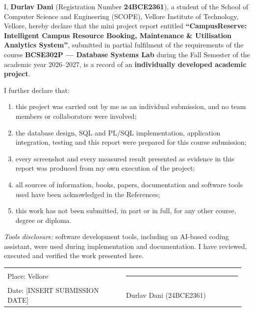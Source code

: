 \documentclass[12pt,a4paper,oneside]{report}
\newcommand{\submissiondate}{[INSERT SUBMISSION DATE]}
\renewcommand{\_}{\origus\allowbreak}
\begin{document}
I, \textbf{Durlav Dani} (Registration Number \textbf{24BCE2361}), a student of the School of Computer Science and Engineering (SCOPE), Vellore Institute of Technology, Vellore, hereby declare that the mini project report entitled \textbf{``CampusReserve: Intelligent Campus Resource Booking, Maintenance \& Utilisation Analytics System''}, submitted in partial fulfilment of the requirements of the course \textbf{BCSE302P --- Database Systems Lab} during the Fall Semester of the academic year 2026--2027, is a record of an \textbf{individually developed academic project}.

I further declare that:
\begin{enumerate}
  \item this project was carried out by me as an individual submission, and no team members or collaborators were involved;
  \item the database design, SQL and PL/SQL implementation, application integration, testing and this report were prepared for this course submission;
  \item every screenshot and every measured result presented as evidence in this report was produced from my own execution of the project;
  \item all sources of information, books, papers, documentation and software tools used have been acknowledged in the References;
  \item this work has not been submitted, in part or in full, for any other course, degree or diploma.
\end{enumerate}

\noindent\textit{Tools disclosure:} software development tools, including an AI-based coding assistant, were used during implementation and documentation. I have reviewed, executed and verified the work presented here.

\vspace{2cm}
\noindent
\begin{tabular}{@{}p{0.48\linewidth}p{0.48\linewidth}@{}}
Place: Vellore & \hfill \rule{5.5cm}{0.4pt}\\
Date: \submissiondate & \hfill Durlav Dani (24BCE2361)\\
\end{tabular}

\end{document}
